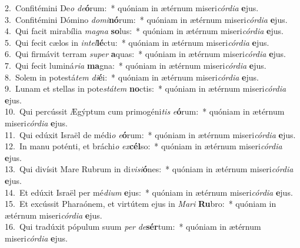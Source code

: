 {2.~}Confitémini De\textit{o} \textit{de}\textbf{ó}rum:~* quóniam in ætérnum miseri\textit{cór}\textit{di}\textit{a} \textbf{e}jus.\\
{3.~}Confitémini Dómino \textit{do}\textit{mi}\textbf{nó}rum:~* quóniam in ætérnum miseri\textit{cór}\textit{di}\textit{a} \textbf{e}jus.\\
{4.~}Qui facit mirabília \textit{ma}\textit{gna} \textbf{so}lus:~* quóniam in ætérnum miseri\textit{cór}\textit{di}\textit{a} \textbf{e}jus.\\
{5.~}Qui fecit cælos in \textit{in}\textit{tel}\textbf{lé}ctu:~* quóniam in ætérnum miseri\textit{cór}\textit{di}\textit{a} \textbf{e}jus.\\
{6.~}Qui firmávit terram \textit{su}\textit{per} \textbf{a}quas:~* quóniam in ætérnum miseri\textit{cór}\textit{di}\textit{a} \textbf{e}jus.\\
{7.~}Qui fecit luminá\textit{ri}\textit{a} \textbf{ma}gna:~* quóniam in ætérnum miseri\textit{cór}\textit{di}\textit{a} \textbf{e}jus.\\
{8.~}Solem in potestá\textit{tem} \textit{di}\textbf{é}i:~* quóniam in ætérnum miseri\textit{cór}\textit{di}\textit{a} \textbf{e}jus.\\
{9.~}Lunam et stellas in pote\textit{stá}\textit{tem} \textbf{no}ctis:~* quóniam in ætérnum miseri\textit{cór}\textit{di}\textit{a} \textbf{e}jus.\\
{10.~}Qui percússit Ægýptum cum primogéni\textit{tis} \textit{e}\textbf{ó}rum:~* quóniam in ætérnum miseri\textit{cór}\textit{di}\textit{a} \textbf{e}jus.\\
{11.~}Qui edúxit Israël de médi\textit{o} \textit{e}\textbf{ó}rum:~* quóniam in ætérnum miseri\textit{cór}\textit{di}\textit{a} \textbf{e}jus.\\
{12.~}In manu poténti, et bráchi\textit{o} \textit{ex}\textbf{cél}so:~* quóniam in ætérnum miseri\textit{cór}\textit{di}\textit{a} \textbf{e}jus.\\
{13.~}Qui divísit Mare Rubrum in di\textit{vi}\textit{si}\textbf{ó}nes:~* quóniam in ætérnum miseri\textit{cór}\textit{di}\textit{a} \textbf{e}jus.\\
{14.~}Et edúxit Israël per mé\textit{di}\textit{um} \textbf{e}jus:~* quóniam in ætérnum miseri\textit{cór}\textit{di}\textit{a} \textbf{e}jus.\\
{15.~}Et excússit Pharaónem, et virtútem ejus in \textit{Ma}\textit{ri} \textbf{Ru}bro:~* quóniam in ætérnum miseri\textit{cór}\textit{di}\textit{a} \textbf{e}jus.\\
{16.~}Qui tradúxit pópulum suum \textit{per} \textit{de}\textbf{sér}tum:~* quóniam in ætérnum miseri\textit{cór}\textit{di}\textit{a} \textbf{e}jus.\\
